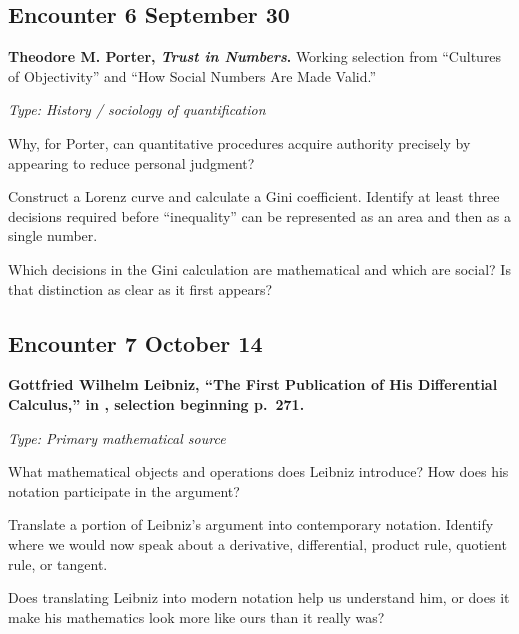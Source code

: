 \subsection*{Encounter 6 \hfill September 30}

\textbf{Theodore M. Porter, \emph{Trust in Numbers}.}
Working selection from ``Cultures of Objectivity'' and ``How Social Numbers
Are Made Valid.'' \parencite{porter1995}

\textit{Type: History / sociology of quantification}

\begin{description}[leftmargin=1.15in,style=nextline]
\item[\textcolor{LangRed}{READ}]
Why, for Porter, can quantitative procedures acquire authority precisely by
appearing to reduce personal judgment?
\item[\textcolor{LangRed}{CONNECT}]
Construct a Lorenz curve and calculate a Gini coefficient. Identify at least
three decisions required before ``inequality'' can be represented as an area
and then as a single number.
\item[\textcolor{LangRed}{QUESTION}]
Which decisions in the Gini calculation are mathematical and which are social?
Is that distinction as clear as it first appears?
\end{description}



\subsection*{Encounter 7 \hfill October 14}

\textbf{Gottfried Wilhelm Leibniz, ``The First Publication of His
Differential Calculus,'' in \textcite{struik1986},
selection beginning p.~271.}

\textit{Type: Primary mathematical source}

\begin{description}[leftmargin=1.15in,style=nextline]

\item[\textcolor{LangRed}{READ}]
What mathematical objects and operations does Leibniz introduce?
How does his notation participate in the argument?

\item[\textcolor{LangRed}{CONNECT}]
Translate a portion of Leibniz's argument into contemporary notation.
Identify where we would now speak about a derivative, differential,
product rule, quotient rule, or tangent.

\item[\textcolor{LangRed}{QUESTION}]
Does translating Leibniz into modern notation help us understand him,
or does it make his mathematics look more like ours than it really was?

\end{description}

